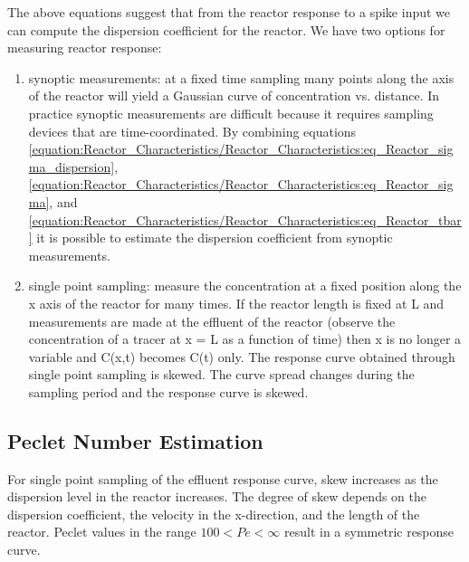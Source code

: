 \documentclass[letterpaper,10pt,english]{sphinxmanual}
\begin{document}
The above equations suggest that from the reactor response to a spike input we can compute the dispersion coefficient for the reactor. We have two options for measuring reactor response:
\begin{enumerate}
\item {} 
synoptic measurements: at a fixed time sampling many points along the axis of the reactor will yield a Gaussian curve of concentration vs. distance. In practice synoptic measurements are difficult because it requires sampling devices that are time-coordinated. By combining equations \eqref{equation:Reactor_Characteristics/Reactor_Characteristics:eq_Reactor_sigma_dispersion}, \eqref{equation:Reactor_Characteristics/Reactor_Characteristics:eq_Reactor_sigma}, and \eqref{equation:Reactor_Characteristics/Reactor_Characteristics:eq_Reactor_tbar} it is possible to estimate the dispersion coefficient from synoptic measurements.

\item {} 
single point sampling: measure the concentration at a fixed position along the x axis of the reactor for many times. If the reactor length is fixed at L and measurements are made at the effluent of the reactor (observe the concentration of a tracer at x = L as a function of time) then x is no longer a variable and C(x,t) becomes C(t) only. The response curve obtained through single point sampling is skewed. The curve spread changes during the sampling period and the response curve is skewed.

\end{enumerate}


\subsection{Peclet Number Estimation}
\label{\detokenize{Reactor_Characteristics/Reactor_Characteristics:peclet-number-estimation}}
For single point sampling of the effluent response curve, skew increases as the dispersion level in the reactor increases. The degree of skew depends on the dispersion coefficient, the velocity in the x-direction, and the length of the reactor. Peclet values in the range \(100\mathrm{<}Pe \mathrm{<} \mathrm{\infty}\) result in a symmetric response curve.
\end{document}

